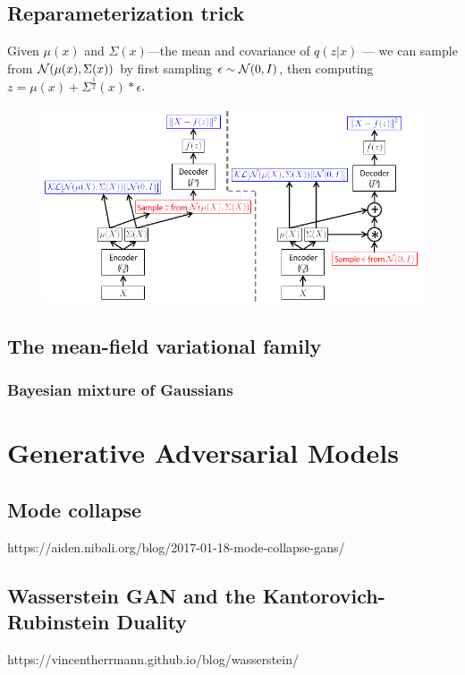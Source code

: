 \subsection{Reparameterization trick}
Given $\mu(x)$ and $\Sigma(x)$—the mean and covariance of $q(z|x)$ — we can sample from
$\mathcal{N}(\mu(x), \Sigma(x))$ by first sampling $\epsilon \sim \mathcal{N}(0, I)$, then computing
$z = \mu(x) + \Sigma^{\frac{1}{2}}(x) * \epsilon$.

\begin{figure}[H]
    \centering
    \includegraphics[width=12cm]{images/vae_reparameterization_trick.png}
    \label{fig:vae_reparameterization_trick}
\end{figure}

\subsection{The mean-field variational family}
\subsubsection{Bayesian mixture of Gaussians}


\section{Generative Adversarial Models}

\subsection{Mode collapse}
https://aiden.nibali.org/blog/2017-01-18-mode-collapse-gans/

\subsection{Wasserstein GAN and the Kantorovich-Rubinstein Duality}
https://vincentherrmann.github.io/blog/wasserstein/

